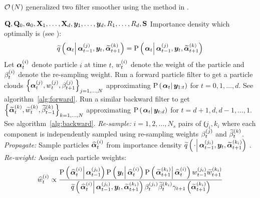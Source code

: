 \newpage

\begin{algorithm}[H]
\caption{$\mathcal{O}\left( N\right)$ generalized two filter smoother using the method in \cite{fearnhead10}.}\label{alg:ONsmoother}
\begin{algorithmic}[1]\raggedright
\INPUT
\Statex $\mathbf{Q},\mathbf{Q}_0,\bm{a}_0,\mathbf{X}_1,\dots,\mathbf{X}_d,\bm{y}_1,\dots,\bm{y}_d,R_1,\dots,R_d,\mathbf{S}$
%
\Statex Importance density which optimally is (see \citet[page 453]{fearnhead10}): 
\Statex \begin{equation}
	\IDAproxC{\vec{\alpha}_t}{\partic{\vec{\alpha}}{t-1}{j},\vec{y}_t, \particB{\vec{\alpha}}{t+1}{k}} = 
%
	\propC{\vec{\alpha}_t}{\partic{\vec{\alpha}}{t-1}{j},\vec{y}_t, \particB{\vec{\alpha}}{t+1}{k}}
\end{equation}
%
%
\Statex Let $\bm{\alpha}_{t}^{\left( i\right)}$ denote particle $i$ at time $t$, $w_{t}^{\left( i\right)}$ denote the weight of the particle and $\beta_{t}^{\left( i\right)}$ denote the re-sampling weight.
%
\State Run a forward particle filter to get a particle clouds %
	$\left\{ \bm{\alpha}_{t}^{\left( j\right)}, w_{t}^{\left( j\right)}, \beta_{t + 1}^{\left( j\right)}\right\}_{j=1,\dots,N}$ %
	approximating $\propC{\vec{\alpha}_t}{\vec{y}_{1:t}}$ for $t = 0, 1, \dots, d$. See algorithm~\ref{alg:forward}.
\EndProcedure
%
\State Run a similar backward filter to get %
	$\left\{ \widetilde{\bm{\alpha}}_{t}^{\left( k\right)}, \widetilde{w}_{t}^{\left( k\right)}, \widetilde{\beta}_{t - 1}^{\left( k\right)}\right\}_{k=1,\dots,N}$  %
	approximating $\propC{\vec{\alpha}_t}{\vec{y}_{t:d}}$ for $t = d + 1, d, d-1, \dots, 1$. See algorithm~\ref{alg:backward}.
\EndProcedure
% 
\StateXX \emph{Re-sample:}
\State $i=1,2,\dots,N_s$ pairs of $\Lparen{j_i, k_i}$ where each component is independently sampled using re-sampling weights $\beta_{t}^{\left( j\right)}$ and $\widetilde{\beta}_{t}^{\left( k\right)}$.
%
\StateXX \emph{Propagate:} 
\State Sample particles $\widehat{\bm{\alpha}}_{t}^{\left( i\right)}$ from importance density %
	$\IDAproxC{\cdot}{\partic{\vec{\alpha}}{t-1}{j_i},\vec{y}_t, \particB{\vec{\alpha}}{t + 1}{k_i}}$%
.%
\StateXX \emph{Re-weight:}
\State Assign each particle weights:
\StateXX \begin{equation}\label{eqn:combineWeight}
 \particS{w}{t}{i} \propto \frac{
 	\propC{\particS{\vec{\alpha}}{t}{i}}{\partic{\vec{\alpha}}{t - 1}{j_i}}
 	\propC{\vec{y}_t}{\particS{\vec{\alpha}}{t}{i}}
 	\propC{\particB{\vec{\alpha}}{t + 1}{k_i}}{\particS{\vec{\alpha}}{t}{i}}
 	\partic{w}{t - 1}{j_i}\particB{w}{t + 1}{k_i}
 	}{ %
 	\IDAproxC{\particS{\vec{\alpha}}{t}{i}}{\partic{\vec{\alpha}}{t-1}{j_i},\vec{y}_t, \particB{\vec{\alpha}}{t+1}{k_i}}
 	\partic{\beta}{t}{j_i}\particB{\beta}{t}{k_i}\gamma_{t +1}\Lparen{\particB{\vec{\alpha}}{t+1}{k_i}}
 	} %
\end{equation}
\EndFor
\EndProcedure
\end{algorithmic}
\end{algorithm}



